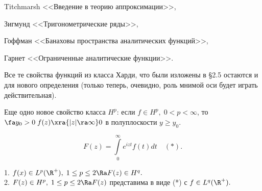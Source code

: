 \documentclass[a4paper]{article}
\begin{document}
\medskip
Titchmarsh <<Введение в  теорию аппроксимации>>,

Зигмунд <<Тригонометрические ряды>>,

Гоффман <<Банаховы пространства аналитических функций>>,

Гарнет <<Ограниченные аналитические функции>>.

\medskip
Все те свойства функций из класса Харди, что были изложены в \S2.5 остаются и для нового определения (только
теперь, очевидно, роль мнимой оси будет играть действительная).

Еще одно новое свойство класса $H^p$: если $f\in H^p,\;0<p<\infty$, то $\fa
y_0>0\;f(z)\xra{|z|\ra\infty}0$ в полуплоскости $y\ge y_0.$

$$F(z)=\int\limits_0^{\infty}e^{izt}f(t)dt\quad (*).$$

\begin{theorem}\label{104}
1. $f(x)\in L^p(\R ^+),\;1\le p\le2\Ra F(z)\in H^q.$ \\\hangindent=2.3cm 2. $F(z)\in
H^p,\;1\le p\le2\Ra F(z)$ представима в виде (*) с $f\in L^q(\R ^+).$
\end{theorem}
\end{document}
